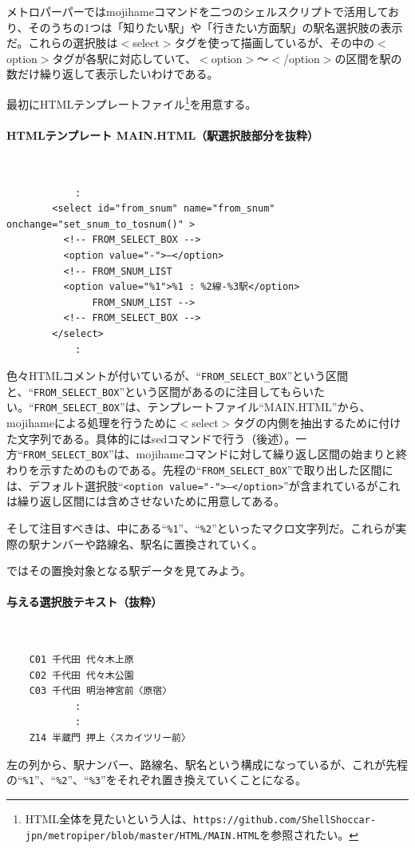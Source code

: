 メトロパーパーではmojihameコマンドを二つのシェルスクリプトで活用しており、そのうちの1つは「知りたい駅」や「行きたい方面駅」の駅名選択肢の表示だ。これらの選択肢は$<$select$>$タグを使って描画しているが、その中の$<$option$>$タグが各駅に対応していて、$<$option$>$～$<$/option$>$の区間を駅の数だけ繰り返して表示したいわけである。

最初にHTMLテンプレートファイル\footnote{HTML全体を見たいという人は、\verb|https://github.com/ShellShoccar-jpn/metropiper/blob/master/HTML/MAIN.HTML|を参照されたい。}を用意する。
\paragraph*{HTMLテンプレート MAIN.HTML（駅選択肢部分を抜粋）} 　\\
\begin{frameboxit}{160.0mm}
\begin{verbatim}
	        :
	    <select id="from_snum" name="from_snum" onchange="set_snum_to_tosnum()" >
	      <!-- FROM_SELECT_BOX -->
	      <option value="-">―</option>
	      <!-- FROM_SNUM_LIST
	      <option value="%1">%1 : %2線-%3駅</option>
	           FROM_SNUM_LIST -->
	      <!-- FROM_SELECT_BOX -->
	    </select>
	        :
\end{verbatim}
\end{frameboxit}

色々HTMLコメントが付いているが、``\verb|FROM_SELECT_BOX|''という区間と、``\verb|FROM_SELECT_BOX|''という区間があるのに注目してもらいたい。``\verb|FROM_SELECT_BOX|''は、テンプレートファイル``MAIN.HTML''から、mojihameによる処理を行うために$<$select$>$タグの内側を抽出するために付けた文字列である。具体的にはsedコマンドで行う（後述）。一方``\verb|FROM_SELECT_BOX|''は、mojihameコマンドに対して繰り返し区間の始まりと終わりを示すためのものである。先程の``\verb|FROM_SELECT_BOX|''で取り出した区間には、デフォルト選択肢``\verb|<option value="-">―</option>|''が含まれているがこれは繰り返し区間には含めさせないために用意してある。

そして注目すべきは、中にある``\verb|%1|''、``\verb|%2|''といったマクロ文字列だ。これらが実際の駅ナンバーや路線名、駅名に置換されていく。

ではその置換対象となる駅データを見てみよう。
\paragraph*{与える選択肢テキスト（抜粋）} 　\\
\begin{frameboxit}{160.0mm}
\begin{verbatim}
	C01 千代田 代々木上原
	C02 千代田 代々木公園
	C03 千代田 明治神宮前〈原宿〉
	        :
	        :
	Z14 半蔵門 押上〈スカイツリー前〉
\end{verbatim}
\end{frameboxit}
左の列から、駅ナンバー、路線名、駅名という構成になっているが、これが先程の``\verb|%1|''、``\verb|%2|''、``\verb|%3|''をそれぞれ置き換えていくことになる。

